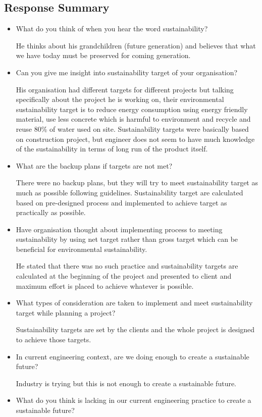\documentclass{article}
\begin{document}
\subsection{Response Summary}\label{interview}
\begin{itemize}
\item What do you think of when you hear the word sustainability?


He thinks about his grandchildren (future generation) and believes that what we have today must be preserved for coming generation. 
\item Can you give me insight into sustainability target of your organisation?


His organisation had different targets for different projects but talking specifically about the project he is working on, their environmental sustainability target is to reduce energy consumption using energy friendly material, use less concrete which is harmful to environment and recycle and reuse 80\% of water used on site. Sustainability targets were basically based on construction project, but engineer does not seem to have much knowledge of the sustainability in terms of long run of the product itself.
\item What are the backup plans if targets are not met?


There were no backup plans, but they will try to meet sustainability target as much as possible following guidelines. Sustainability target are calculated based on pre-designed process and implemented to achieve target as practically as possible.
\item Have organisation thought about implementing process to meeting sustainability by using net target rather than gross target which can be beneficial for environmental sustainability.


He stated that there was no such practice and sustainability targets are calculated at the beginning of the project and presented to client and maximum effort is placed to achieve whatever is possible.
\item What types of consideration are taken to implement and meet sustainability target while planning a project?


Sustainability targets are set by the clients and the whole project is designed to achieve those targets.
\item In current engineering context, are we doing enough to create a sustainable future?


Industry is trying but this is not enough to create a sustainable future. 
\item What do you think is lacking in our current engineering practice to create a sustainable future? 



\end{itemize}
\end{document}
